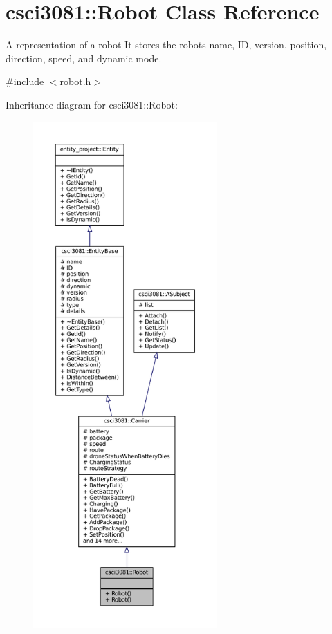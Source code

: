 \hypertarget{classcsci3081_1_1Robot}{}\section{csci3081\+:\+:Robot Class Reference}
\label{classcsci3081_1_1Robot}


A representation of a robot It stores the robot\textquotesingle{}s name, ID, version, position, direction, speed, and dynamic mode.  




{\ttfamily \#include $<$robot.\+h$>$}



Inheritance diagram for csci3081\+:\+:Robot\+:
\nopagebreak
\begin{figure}[H]
\begin{center}
\leavevmode
\includegraphics[height=550pt]{classcsci3081_1_1Robot__inherit__graph}
\end{center}
\end{figure}
